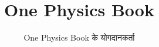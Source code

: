 \documentclass[11pt,a4paper,twoside,openany]{book}
\title{One Physics Book}
\author{One Physics Book के योगदानकर्ता}
\date{\bookdate}
\begin{document}
\frontmatter



\tableofcontents

\mainmatter





\appendix
\part{\omsolutionspart}




\backmatter
\printindex
\end{document}
